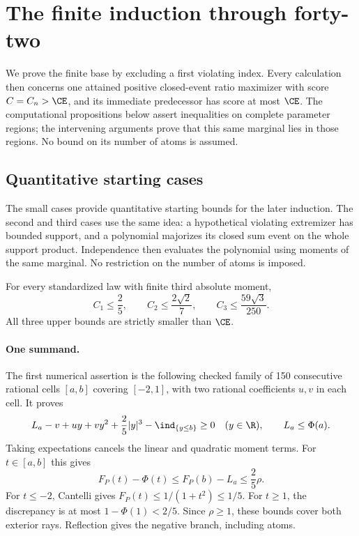 \section{The finite induction through forty-two}\label{j:finite:chapter}
We prove the finite base by excluding a first violating index. Every
calculation then concerns one attained positive closed-event ratio maximizer
with score $C=C_n>\CE$, and its immediate predecessor has score at most
$\CE$. The computational propositions below assert inequalities on complete
parameter regions; the intervening arguments prove that this same marginal
lies in those regions. No bound on its number of atoms is assumed.

\subsection{Quantitative starting cases}\label{j:finite:starting}

The small cases provide quantitative starting bounds for the later
induction.  The second and third cases use the same idea: a hypothetical
violating extremizer has bounded support, and a polynomial majorizes its
closed sum event on the whole support product.  Independence then evaluates
the polynomial using moments of the same marginal.  No restriction on the
number of atoms is imposed.

\begin{theorem}\label{j:finite:n123}
For every standardized law with finite third absolute moment,
\[
 C_1\le\frac25,\qquad C_2\le\frac{2\sqrt2}{7},\qquad
 C_3\le\frac{59\sqrt3}{250}.
\]
All three upper bounds are strictly smaller than $\CE$.
\end{theorem}

\paragraph{One summand.}
The first numerical assertion is the following checked family of 150 consecutive rational cells $[a,b]$
covering $[-2,1]$, with two rational coefficients $u,v$ in each cell.
It proves
\begin{equation}\label{j:finite:n1-dual}
 L_a-v+uy+vy^2+\frac25|y|^3-\ind_{\{y\le b\}}\ge0
 \quad(y\in\R),\qquad L_a\le\Phi(a).
\end{equation}
Taking expectations cancels the linear and quadratic moment terms.
For $t\in[a,b]$ this gives
\[
 F_P(t)-\Phi(t)\le F_P(b)-L_a\le\frac25\rho.
\]
For $t\le-2$, Cantelli gives $F_P(t)\le1/(1+t^2)\le1/5$.
For $t\ge1$, the discrepancy is at most $1-\Phi(1)<2/5$.
Since $\rho\ge1$, these bounds cover both exterior rays.
Reflection gives the negative branch, including atoms.

